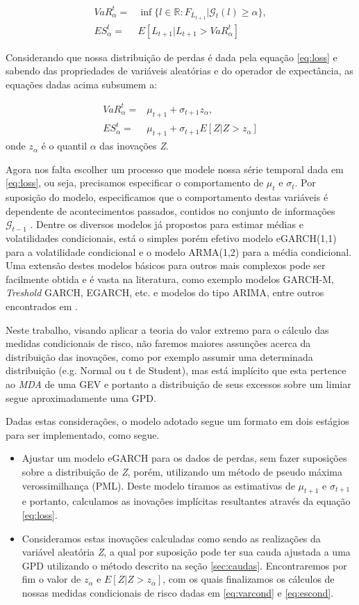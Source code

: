 \documentclass[review]{elsarticle}
\theoremstyle{definition}
\begin{document}
\begin{align}
VaR_\alpha^t=&\inf\{l \in \mathbb{R}: F_{L_{t+1}} | \mathcal{G}_t(l) \geq \alpha\}, \\
ES_\alpha^t=&E[L_{t+1} | L_{t+1} > VaR_\alpha^t]
\end{align}

Considerando que nossa distribuição de perdas é dada pela equação \eqref{eq:loss} e sabendo das propriedades de variáveis aleatórias e do operador de expectância, as equações dadas acima subsumem a:

\begin{align}
VaR_\alpha^t=&\mu_{t+1}+\sigma_{t+1}z_\alpha, \label{eq:varcond} \\
ES_\alpha^t=&\mu_{t+1}+\sigma_{t+1}E[Z | Z>z_\alpha] \label{eq:escond}
\end{align}
onde $z_\alpha$ é o quantil $\alpha$ das inovações \emph{Z}.

Agora nos falta escolher um processo que modele nossa série temporal dada em \eqref{eq:loss}, ou seja, precisamos especificar o comportamento de $\mu_t$ e $\sigma_t$. Por suposição do modelo, especificamos que o comportamento destas variáveis é dependente de acontecimentos passados, contidos no conjunto de informações  $\mathcal{G}_{t-1}$ . Dentre os diversos modelos já propostos para estimar médias e volatilidades condicionais, está o simples porém efetivo modelo eGARCH(1,1) para a volatilidade condicional e o modelo ARMA(1,2) para a média condicional. Uma extensão destes modelos básicos para outros mais complexos pode ser facilmente obtida e é vasta na literatura, como exemplo modelos GARCH-M, \emph{Treshold} GARCH, EGARCH, etc. e modelos do tipo ARIMA, entre outros encontrados em \cite{Tsay2010}. 

Neste trabalho, visando aplicar a teoria do valor extremo para o cálculo das medidas condicionais de risco, não faremos maiores assunções acerca da distribuição das inovações, como por exemplo assumir uma determinada distribuição (e.g. Normal ou t de Student), mas está implícito que esta pertence ao \emph{MDA} de uma GEV e portanto a distribuição de seus excessos sobre um limiar segue aproximadamente uma GPD.

Dadas estas considerações, o modelo adotado segue um formato em dois estágios para ser implementado, como segue.
\begin{itemize}
	\item Ajustar um modelo eGARCH para os dados de perdas, sem fazer suposições sobre a distribuição de \emph{Z}, porém, utilizando um método de pseudo máxima verossimilhança (PML). Deste modelo tiramos as estimativas de $\mu_{t+1}$ e $\sigma_{t+1}$ e portanto, calculamos as inovações implícitas resultantes através da equação \eqref{eq:loss}.
	\item Consideramos estas inovações calculadas como sendo as realizações da variável aleatória \emph{Z}, a qual por suposição pode ter sua cauda ajustada a uma GPD utilizando o método descrito na seção \ref{sec:caudas}. Encontraremos por fim o valor de $z_\alpha$ e $E[Z|Z>z_\alpha]$, com os quais finalizamos os cálculos de nossas medidas condicionais de risco dadas em \eqref{eq:varcond} e \eqref{eq:escond}.
\end{itemize}
\end{document}
